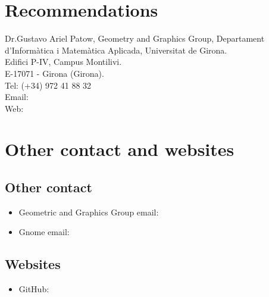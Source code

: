\section{Recommendations}
    {
        Dr.Gustavo Ariel Patow, Geometry and Graphics Group, Departament d'Inform\`atica i Matem\`atica Aplicada, Universitat de Girona. \\
        Edifici P-IV, Campus Montilivi. \\
        E-17071 - Girona (Girona). \\
        Tel: (+34) 972 41 88 32 \\
        Email:  \\
        Web: 
    }

% 
% 
% 
     
\section{Other contact and websites}

    \subsection{Other contact}
        \begin{indentpar}{72pt}
            \begin{itemize}
                \item Geometric and Graphics Group email: 
                \item Gnome email: 
            \end{itemize}           
        \end{indentpar}
        
    \subsection{Websites}
        \begin{indentpar}{72pt}
            \begin{itemize}
                \item GitHub: 
            \end{itemize}            
        \end{indentpar}


